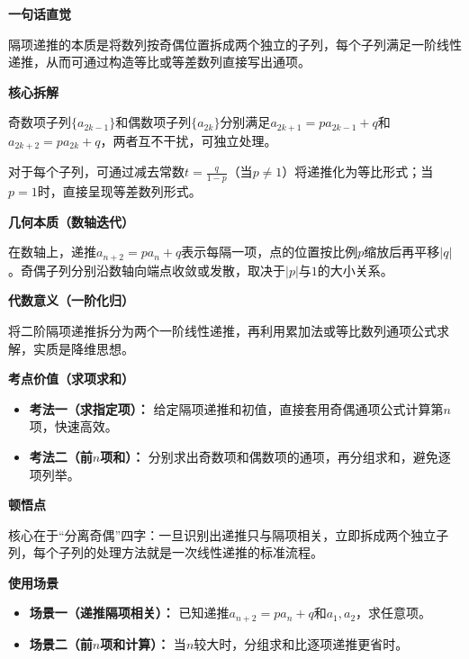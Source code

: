 \begin{explanationbox}
	\textbf{\textcolor{CExplanation}{一句话直觉}}

	隔项递推的本质是将数列按奇偶位置拆成两个独立的子列，每个子列满足一阶线性递推，从而可通过构造等比或等差数列直接写出通项。

	\medskip
	\textbf{\textcolor{CExplanation}{核心拆解}}
	\begin{description}[style=nextline, leftmargin=2.8em, labelsep=0.5em, itemsep=0.45em]
		\item[\textbf{要点一（子列独立）：}] 奇数项子列$\{a_{2k-1}\}$和偶数项子列$\{a_{2k}\}$分别满足$a_{2k+1}=p a_{2k-1}+q$和$a_{2k+2}=p a_{2k}+q$，两者互不干扰，可独立处理。
		\item[\textbf{要点二（构造常数）：}] 对于每个子列，可通过减去常数$t=\frac{q}{1-p}$（当$p\neq1$）将递推化为等比形式；当$p=1$时，直接呈现等差数列形式。
	\end{description}

	\medskip
	\textbf{\textcolor{CExplanation}{几何本质（数轴迭代）}}

	在数轴上，递推$a_{n+2}=p a_n+q$表示每隔一项，点的位置按比例$p$缩放后再平移$|q|$。奇偶子列分别沿数轴向端点收敛或发散，取决于$|p|$与$1$的大小关系。

	\medskip
	\textbf{\textcolor{CExplanation}{代数意义（一阶化归）}}

	将二阶隔项递推拆分为两个一阶线性递推，再利用累加法或等比数列通项公式求解，实质是降维思想。

	\medskip
	\textbf{\textcolor{CExplanation}{考点价值（求项求和）}}
	\begin{itemize}[leftmargin=*, itemsep=0.5em, topsep=0.4em]
		\item \textbf{考法一（求指定项）：} 给定隔项递推和初值，直接套用奇偶通项公式计算第$n$项，快速高效。
		\item \textbf{考法二（前$n$项和）：} 分别求出奇数项和偶数项的通项，再分组求和，避免逐项列举。
	\end{itemize}

	\medskip
	\textbf{\textcolor{CExplanation}{顿悟点}}

	核心在于“分离奇偶”四字：一旦识别出递推只与隔项相关，立即拆成两个独立子列，每个子列的处理方法就是一次线性递推的标准流程。

	\medskip
	\textbf{\textcolor{CExplanation}{使用场景}}
	\begin{itemize}[leftmargin=*, itemsep=0.5em, topsep=0.4em]
		\item \textbf{场景一（递推隔项相关）：} 已知递推$a_{n+2}=p a_n+q$和$a_1,a_2$，求任意项。
		\item \textbf{场景二（前$n$项和计算）：} 当$n$较大时，分组求和比逐项递推更省时。
	\end{itemize}
\end{explanationbox}
